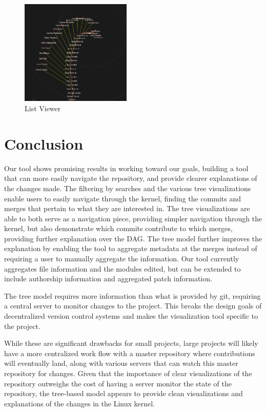 \documentclass[conference, draftclsnofoot, draft]{IEEEtran}
\begin{document}

\begin{figure}
        \centering
        \includegraphics[width=0.47\textwidth]{figures/gitvis.png}
        \caption{List Viewer}
        \label{fig:listviewer}
\end{figure}



\section{Conclusion}

Our tool shows promising results in working toward our goals, building a tool that
can more easily navigate the repository, and provide clearer explanations of the
changes made. The filtering by searches and the various tree visualizations enable
users to easily navigate through the kernel, finding the commits and merges that
pertain to what they are interested in. The tree visualizations are able to both
serve as a navigation piece, providing simpler navigation through the kernel, but
also demonstrate which commits contribute to which merges, providing further
explanation over the DAG. The tree model further improves the explanation by enabling
the tool to aggregate metadata at the merges instead of requiring a user to manually
aggregate the information. Our tool currently aggregates file information and the
modules edited, but can be extended to include authorship information and aggregated
patch information.

The tree model requires more information than what is provided by git, requiring a
central server to monitor changes to the project. This breaks the design goals of
decentralized version control systems and makes the visualization tool specific to
the project.

While these are significant drawbacks for small projects, large projects will likely
have a more centralized work flow with a master repository where contributions will
eventually land, along with various servers that can watch this master repository
for changes. Given that the importance of clear visualizations of the repository
outweighs the cost of having a server monitor the state of the repository, the
tree-based model appears to provide clean visualizations and explanations of the
changes in the Linux kernel.

\nocite{*}



\end{document}
